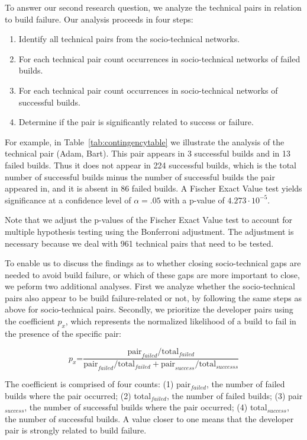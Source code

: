 To answer our second research question, we analyze the
technical pairs in relation to build
failure. Our analysis proceeds in four steps:

\begin{enumerate}
\item Identify all technical pairs from the socio-technical networks.
\item For each technical pair count occurrences in socio-technical networks of
failed builds.
\item For each technical pair count occurrences in socio-technical networks of
successful builds.
\item Determine if the pair is significantly related to success or failure.
\end{enumerate}

For example, in Table~\ref{tab:contingencytable} we illustrate the analysis of
the technical pair (Adam, Bart). This pair appears in 3 successful builds and in
13 failed builds. Thus it does not appear in 224 successful builds, which is the total number of successful builds minus the number of successful builds the pair appeared in, and it is absent in 86 failed builds.
A Fischer Exact Value test yields significance at a confidence level of $\alpha = .05$ with a p-value of $4.273\cdot10^{-5}$.

Note that we adjust the p-values of the Fischer Exact Value test to account for multiple hypothesis testing using the Bonferroni adjustment.
The adjustment is necessary because we deal with 961 technical pairs that need to be tested. 

To enable us to discuss the findings as to whether closing socio-technical gaps
are needed to avoid build failure, or which of these gaps are more important to
close, we peform two additional analyses. 
First we analyze whether the
socio-technical pairs also appear to be build failure-related or not, by
following the same steps as above for socio-technical pairs. 
%
Secondly, we prioritize the developer pairs using the coefficient $p_x$,
which represents the normalized likelihood of a build
to fail in the presence of the specific pair:

\begin{equation}
p_x\text{=}\frac{ \text{pair}_{failed} / \text{total}_{failed} }
                     { \text{pair}_{failed} / \text{total}_{failed} + \text{pair}_{success} / \text{total}_{successs}}
\end{equation}

The coefficient is comprised of four counts: (1) pair$_{failed}$, the number of failed builds where the pair occurred; (2) total$_{failed}$, the number of failed builds; (3) pair$_{success}$, the number of successful builds where the pair occurred; (4) total$_{success}$, the number of successful builds.
A value closer to one means that the developer pair is strongly related to build
failure. %




